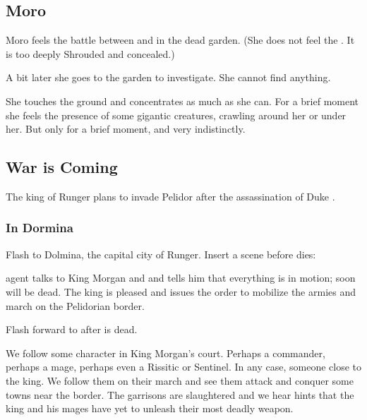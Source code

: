\begin{garbage}
\subsection{Moro \Cornel}
Moro \Cornel{} feels the battle between \Ishnaruchaefir{} and \Teshrial{} in the dead garden. 
(She does not feel the \ghobal. It is too deeply Shrouded and concealed.) 

A bit later she goes to the garden to investigate. 
She cannot find anything.

She touches the ground and concentrates as much as she can. 
For a brief moment she feels the presence of some gigantic creatures, crawling around her or under her. 
But only for a brief moment, and very indistinctly. 









\subsection{War is Coming}
The king of Runger plans to invade Pelidor after the assassination of Duke \Icor. 






\subsubsection{In Dormina}
Flash to Dolmina, the capital city of Runger. 
Insert a scene before \Icor{} dies: 

\hs{\Takestsha} agent talks to King Morgan and and tells him that everything is in motion; soon \Icor{} will be dead. 
The king is pleased and issues the order to mobilize the armies and march on the Pelidorian border.

Flash forward to after \Icor{} is dead. 

We follow some character in King Morgan's court. 
Perhaps a commander, perhaps a mage, perhaps even a Rissitic or Sentinel. 
In any case, someone close to the king. 
We follow them on their march and see them attack and conquer some towns near the border. 
The garrisons are slaughtered and we hear hints that the king and his mages have yet to unleash their most deadly weapon. 






\end{garbage}
